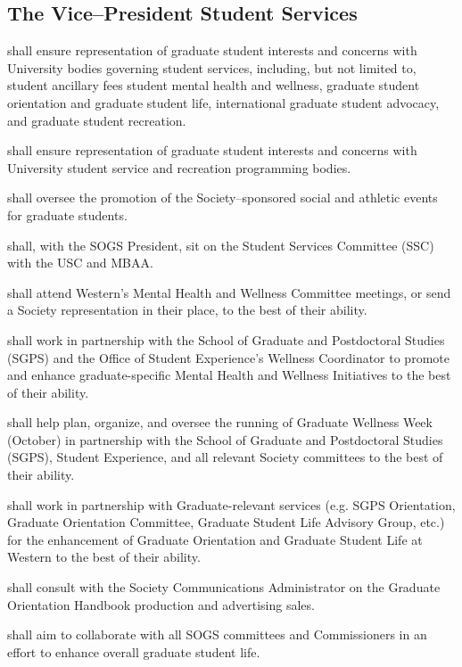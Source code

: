 \subsection {The Vice--President Student Services} 
\begin{longenum}[ label*=\thesubsection.\arabic*., align=left]
	\item shall ensure representation of graduate student interests and concerns with
	University bodies governing student services, including, but not limited to, student ancillary fees student mental health and wellness, graduate student orientation and graduate student life, international graduate student advocacy, and graduate student recreation.
    \item shall ensure representation of graduate student interests and concerns with University student service and recreation programming bodies.
    \item shall oversee the promotion of the Society--sponsored social and athletic events for graduate students.
    \item shall, with the SOGS President, sit on the Student Services Committee (SSC) with the USC and MBAA.
    \item shall attend Western's Mental Health and Wellness Committee meetings, or send a Society
representation in their place, to the best of their ability.
\item shall work in partnership with the School of Graduate and Postdoctoral Studies (SGPS) and the Office of Student Experience's Wellness Coordinator to promote
and enhance graduate-specific Mental Health and Wellness Initiatives to the best of their
ability.
\item shall help plan, organize, and oversee the running of Graduate Wellness Week
(October) in partnership with the School of Graduate and Postdoctoral Studies (SGPS), Student Experience, and all relevant Society
committees to the best of their ability.
\item shall work in partnership with Graduate-relevant services (e.g. SGPS Orientation,
Graduate Orientation Committee, Graduate Student Life Advisory Group, etc.) for the
enhancement of Graduate Orientation and Graduate Student Life at Western to the
best of their ability.
\item shall consult with the Society Communications Administrator on the Graduate
Orientation Handbook production and advertising sales.
\item shall aim to collaborate with all SOGS committees and Commissioners in an effort to enhance overall graduate student life.
    
\end{longenum}

